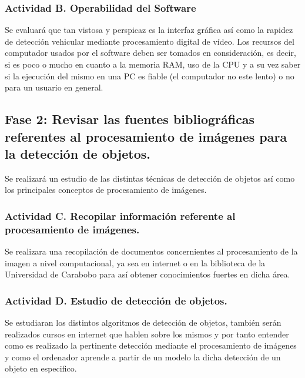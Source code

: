 \subsubsection{Actividad B. Operabilidad del Software}

Se evaluar\'a que tan vistosa y perspicaz es la interfaz gráfica así como la rapidez de detección vehicular mediante procesamiento digital de vídeo. Los recursos del computador usados por el software deben ser tomados en consideración, es decir, si es poco o mucho en cuanto a la memoria RAM, uso de la CPU y a su vez  saber si la ejecución del mismo en una PC es fiable (el computador no este lento) o no para un usuario en general.


\subsection{Fase 2: Revisar las fuentes bibliográficas referentes al procesamiento de imágenes para la detección de objetos.}

Se realizar\'a un estudio de las distintas técnicas de detección de objetos así como los principales conceptos de procesamiento de imágenes.

\subsubsection{Actividad C. Recopilar información referente al procesamiento de imágenes.}

Se realizara una recopilación de documentos concernientes al procesamiento de la imagen a nivel computacional, ya sea en internet o en la biblioteca de la Universidad de Carabobo para así obtener conocimientos fuertes en dicha área.

\subsubsection{Actividad D. Estudio de detección de objetos.}

Se estudiaran los distintos algoritmos de detección de objetos, también serán realizados cursos en internet que hablen sobre los mismos y por tanto entender como es realizado la pertinente detección mediante el procesamiento de imágenes y como el ordenador aprende a partir de un modelo la dicha detección de un objeto en especifico. 


